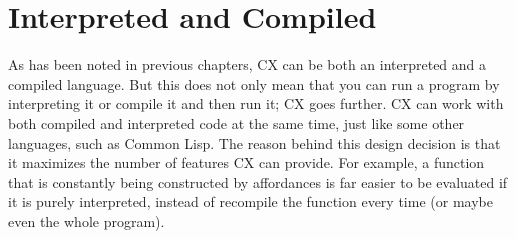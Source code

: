 \documentclass[11pt,fleqn,openany]{book} %
\begin{document}
\chapter{Interpreted and Compiled}
\label{chapter:interpreted-and-compiled}


As has been noted in previous chapters, CX can be both an interpreted and a compiled language. But this does not only mean that you can run a program by interpreting it or compile it and then run it; CX goes further. CX can work with both compiled and interpreted code at the same time, just like some other languages, such as Common Lisp. The reason behind this design decision is that it maximizes the number of features CX can provide. For example, a function that is constantly being constructed by affordances is far easier to be evaluated if it is purely interpreted, instead of recompile the function every time (or maybe even the whole program).
\end{document}
